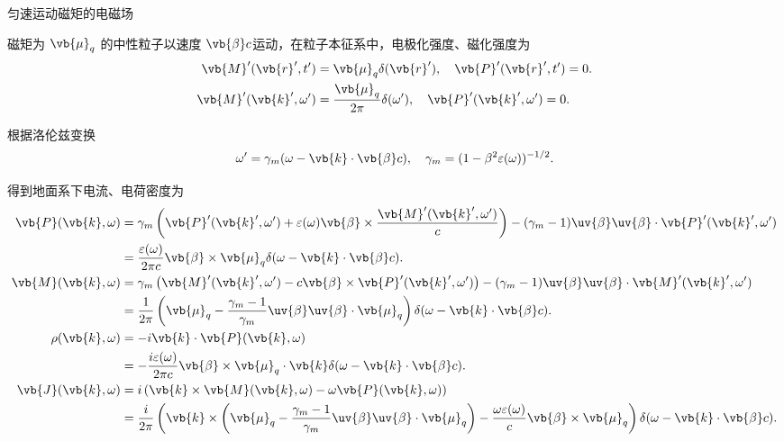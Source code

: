 \begin{example}
	匀速运动磁矩的电磁场

	磁矩为 \(\vb{\mu}_{q}\) 的中性粒子以速度 \(\vb{\beta}c\)运动，在粒子本征系中，电极化强度、磁化强度为
	\begin{align*}
		\vb{M}'(\vb{r}', t') &= \vb{\mu}_{q} \delta(\vb{r}'), \quad
		\vb{P}'(\vb{r}', t') = 0. \\
		\vb{M}'(\vb{k}', \omega') &= \frac{\vb{\mu}_{q}}{2\pi} \delta(\omega'), \quad
		\vb{P}'(\vb{k}', \omega') = 0.
	\end{align*}

	根据洛伦兹变换
	\begin{equation*}
		\omega' = \gamma_{m} (\omega - \vb{k} \cdot \vb{\beta} c), \quad \gamma_{m} = (1 - \beta^{2} \varepsilon(\omega))^{-1/2}.
	\end{equation*}

	得到地面系下电流、电荷密度为
	\begin{align*}
		\vb{P}(\vb{k}, \omega) &= \gamma_{m} \left( \vb{P}'(\vb{k}', \omega') + \varepsilon(\omega) \vb{\beta} \times \frac{\vb{M}'(\vb{k}', \omega')}{c} \right) - (\gamma_{m} - 1) \uv{\beta} \uv{\beta} \cdot \vb{P}'(\vb{k}', \omega') \\
		&= \frac{\varepsilon(\omega)}{2\pi c} \vb{\beta} \times \vb{\mu}_{q} \delta(\omega - \vb{k} \cdot \vb{\beta} c). \\
		\vb{M}(\vb{k}, \omega) &= \gamma_{m} \left( \vb{M}'(\vb{k}', \omega') - c \vb{\beta} \times \vb{P}'(\vb{k}', \omega') \right) - (\gamma_{m} - 1) \uv{\beta} \uv{\beta} \cdot \vb{M}'(\vb{k}', \omega') \\
		&= \frac{1}{2\pi} \left( \vb{\mu}_{q} - \frac{\gamma_{m} - 1}{\gamma_{m}} \uv{\beta} \uv{\beta} \cdot \vb{\mu}_{q} \right) \delta(\omega - \vb{k} \cdot \vb{\beta} c). \\
		\rho(\vb{k}, \omega) &= -i \vb{k} \cdot \vb{P}(\vb{k}, \omega) \\&= -\frac{i \varepsilon(\omega)}{2\pi c} \vb{\beta} \times \vb{\mu}_{q} \cdot \vb{k} \delta(\omega - \vb{k} \cdot \vb{\beta} c). \\
		\vb{J}(\vb{k}, \omega) &= i \left( \vb{k} \times \vb{M}(\vb{k}, \omega) - \omega \vb{P}(\vb{k}, \omega) \right) \\
		&= \frac{i}{2\pi} \left( \vb{k} \times \left( \vb{\mu}_{q} - \frac{\gamma_{m} - 1}{\gamma_{m}} \uv{\beta} \uv{\beta} \cdot \vb{\mu}_{q} \right) - \frac{\omega \varepsilon(\omega)}{c} \vb{\beta} \times \vb{\mu}_{q} \right) \delta(\omega - \vb{k} \cdot \vb{\beta} c).
	\end{align*}


\end{example}
